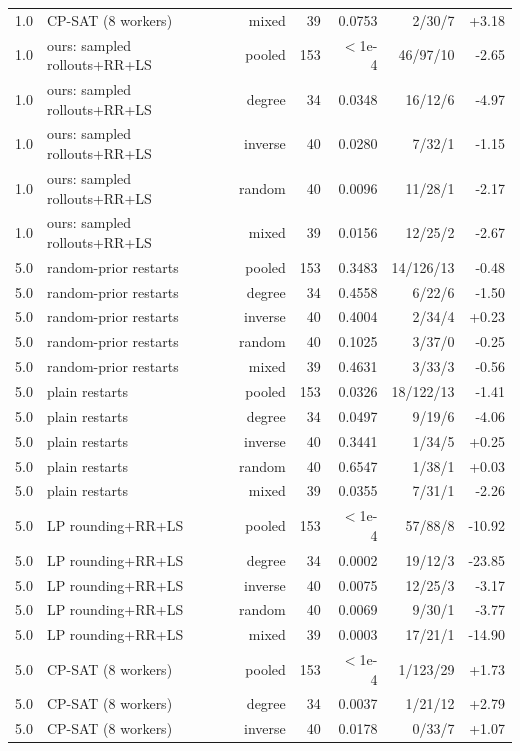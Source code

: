 \begin{table}[t]
\begin{tabular}{llrrrrr}
1.0 & CP-SAT (8 workers) & mixed & 39 & 0.0753 & 2/30/7 & +3.18 \\
1.0 & ours: sampled rollouts+RR+LS & pooled & 153 & $<$1e-4 & 46/97/10 & -2.65 \\
1.0 & ours: sampled rollouts+RR+LS & degree & 34 & 0.0348 & 16/12/6 & -4.97 \\
1.0 & ours: sampled rollouts+RR+LS & inverse & 40 & 0.0280 & 7/32/1 & -1.15 \\
1.0 & ours: sampled rollouts+RR+LS & random & 40 & 0.0096 & 11/28/1 & -2.17 \\
1.0 & ours: sampled rollouts+RR+LS & mixed & 39 & 0.0156 & 12/25/2 & -2.67 \\
5.0 & random-prior restarts & pooled & 153 & 0.3483 & 14/126/13 & -0.48 \\
5.0 & random-prior restarts & degree & 34 & 0.4558 & 6/22/6 & -1.50 \\
5.0 & random-prior restarts & inverse & 40 & 0.4004 & 2/34/4 & +0.23 \\
5.0 & random-prior restarts & random & 40 & 0.1025 & 3/37/0 & -0.25 \\
5.0 & random-prior restarts & mixed & 39 & 0.4631 & 3/33/3 & -0.56 \\
5.0 & plain restarts & pooled & 153 & 0.0326 & 18/122/13 & -1.41 \\
5.0 & plain restarts & degree & 34 & 0.0497 & 9/19/6 & -4.06 \\
5.0 & plain restarts & inverse & 40 & 0.3441 & 1/34/5 & +0.25 \\
5.0 & plain restarts & random & 40 & 0.6547 & 1/38/1 & +0.03 \\
5.0 & plain restarts & mixed & 39 & 0.0355 & 7/31/1 & -2.26 \\
5.0 & LP rounding+RR+LS & pooled & 153 & $<$1e-4 & 57/88/8 & -10.92 \\
5.0 & LP rounding+RR+LS & degree & 34 & 0.0002 & 19/12/3 & -23.85 \\
5.0 & LP rounding+RR+LS & inverse & 40 & 0.0075 & 12/25/3 & -3.17 \\
5.0 & LP rounding+RR+LS & random & 40 & 0.0069 & 9/30/1 & -3.77 \\
5.0 & LP rounding+RR+LS & mixed & 39 & 0.0003 & 17/21/1 & -14.90 \\
5.0 & CP-SAT (8 workers) & pooled & 153 & $<$1e-4 & 1/123/29 & +1.73 \\
5.0 & CP-SAT (8 workers) & degree & 34 & 0.0037 & 1/21/12 & +2.79 \\
5.0 & CP-SAT (8 workers) & inverse & 40 & 0.0178 & 0/33/7 & +1.07 \\

\end{tabular}
\end{table}
